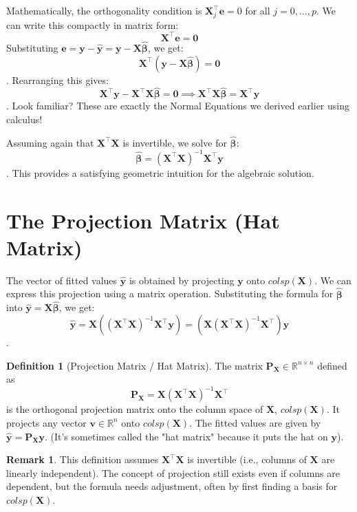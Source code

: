 \documentclass[11pt, letterpaper]{article}
\theoremstyle{definition}
\newtheorem{definition}{Definition}[section]
\newtheorem{remark}{Remark}[section]
\newcommand{\R}{\mathbb{R}}
\newcommand{\mat}[1]{\mathbf{#1}} %
\newcommand{\vect}[1]{\mathbf{#1}} %
\begin{document}
Mathematically, the orthogonality condition is $\vect{X}_j^{\top} \vect{e} = 0$ for all $j=0, \dots, p$. We can write this compactly in matrix form:
\[
\mat{X}^{\top} \vect{e} = \vect{0}
\]
Substituting $\vect{e} = \vect{y} - \hat{\vect{y}} = \vect{y} - \mat{X}\hat{\vect{\beta}}$, we get:
\[
\mat{X}^{\top} (\vect{y} - \mat{X}\hat{\vect{\beta}}) = \vect{0}
\]. Rearranging this gives:
\[
\mat{X}^{\top}\vect{y} - \mat{X}^{\top}\mat{X}\hat{\vect{\beta}} = \vect{0} \implies \mat{X}^{\top}\mat{X}\hat{\vect{\beta}} = \mat{X}^{\top}\vect{y}
\]. Look familiar? These are exactly the Normal Equations we derived earlier using calculus!

Assuming again that $\mat{X}^{\top}\mat{X}$ is invertible, we solve for $\hat{\vect{\beta}}$:
\[
\hat{\vect{\beta}} = (\mat{X}^{\top}\mat{X})^{-1} \mat{X}^{\top}\vect{y}
\]. This provides a satisfying geometric intuition for the algebraic solution.

\section{The Projection Matrix (Hat Matrix)}

The vector of fitted values $\hat{\vect{y}}$ is obtained by projecting $\vect{y}$ onto $colsp(\mat{X})$. We can express this projection using a matrix operation.
Substituting the formula for $\hat{\vect{\beta}}$ into $\hat{\vect{y}} = \mat{X}\hat{\vect{\beta}}$, we get:
\[
\hat{\vect{y}} = \mat{X} \left( (\mat{X}^{\top}\mat{X})^{-1} \mat{X}^{\top}\vect{y} \right) = \left( \mat{X} (\mat{X}^{\top}\mat{X})^{-1} \mat{X}^{\top} \right) \vect{y}
\].

\begin{definition}[Projection Matrix / Hat Matrix]
The matrix $\mat{P}_{\mat{X}} \in \R^{n \times n}$ defined as
\[
\mat{P}_{\mat{X}} = \mat{X} (\mat{X}^{\top}\mat{X})^{-1} \mat{X}^{\top}
\]
is the orthogonal projection matrix onto the column space of $\mat{X}$, $colsp(\mat{X})$. It projects any vector $\vect{v} \in \R^n$ onto $colsp(\mat{X})$. The fitted values are given by $\hat{\vect{y}} = \mat{P}_{\mat{X}}\vect{y}$. (It's sometimes called the "hat matrix" because it puts the hat on $\vect{y}$).
\end{definition}

\begin{remark}
This definition assumes $\mat{X}^{\top}\mat{X}$ is invertible (i.e., columns of $\mat{X}$ are linearly independent). The concept of projection still exists even if columns are dependent, but the formula needs adjustment, often by first finding a basis for $colsp(\mat{X})$.
\end{remark}
\end{document}

